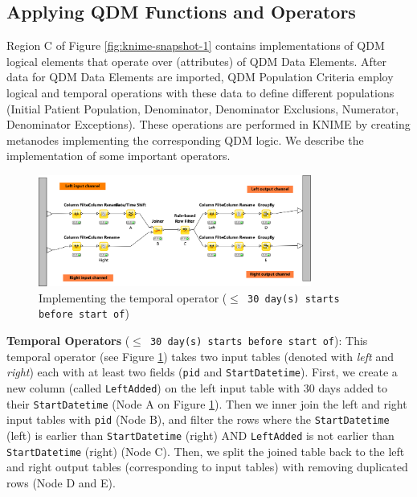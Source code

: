 \documentclass{article}
\begin{document}
\subsection{Applying QDM Functions and Operators}

Region C of Figure \ref{fig:knime-snapshot-1} contains implementations of QDM logical elements that operate over (attributes) of QDM Data Elements. After data for QDM Data Elements are imported, QDM Population Criteria employ logical and temporal operations with these data to define different populations (Initial Patient Population, Denominator, Denominator Exclusions, Numerator, Denominator Exceptions). These operations are performed in KNIME by creating metanodes implementing the corresponding QDM logic. We describe the implementation of some important operators.

\begin{figure}
\centering
	\includegraphics[width=0.8\textwidth]{figures/knime-snapshot-2.png}
	\caption{Implementing the temporal operator (\texttt{$\leq$ 30 day(s) starts before start of})}\label{fig:knime-snapshot-2}
\end{figure}
\vspace{5pt}

\textbf{Temporal Operators} (\texttt{$\leq$ 30 day(s) starts before start of}): This temporal operator (see Figure \ref{fig:knime-snapshot-2}) takes two input tables (denoted with \emph{left} and \emph{right}) each with at least two fields (\texttt{pid} and \texttt{StartDatetime}). First, we create a new column (called \texttt{LeftAdded}) on the left input table with 30 days added to their \texttt{StartDatetime} (Node A on Figure \ref{fig:knime-snapshot-2}). Then we inner join the left and right input tables with \texttt{pid} (Node B), and filter the rows where the \texttt{StartDatetime} (left) is earlier than \texttt{StartDatetime} (right) AND \texttt{LeftAdded} is not earlier than \texttt{StartDatetime} (right) (Node C). Then, we split the joined table back to the left and right output tables (corresponding to input tables) with removing duplicated rows (Node D and E). 
\end{document}
